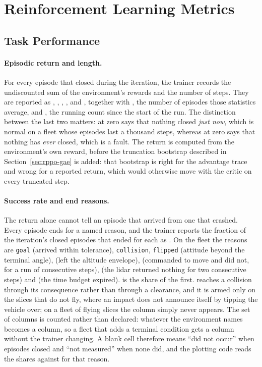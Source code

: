 \section{Reinforcement Learning Metrics}
\label{app:metrics-rl}

\subsection{Task Performance}
\label{sec:metrics-rl-task}

\paragraph{Episodic return and length.}
For every episode that closed during the iteration, the trainer records the
undiscounted sum of the environment's rewards and the number of steps. They
are reported as , ,
, ,  and
, together with , the number of episodes
those statistics average, and , the running count since
the start of the run. The distinction between the last two matters:
 at zero says that nothing closed \emph{just now}, which is
normal on a fleet whose episodes last a thousand steps, whereas
 at zero says that nothing has \emph{ever} closed, which
is a fault. The return is computed from the environment's own reward, before
the truncation bootstrap described in Section~\ref{sec:rppo-gae} is added:
that bootstrap is right for the advantage trace and wrong for a reported
return, which would otherwise move with the critic on every truncated step.

\paragraph{Success rate and end reasons.}
The return alone cannot tell an episode that arrived from one that crashed.
Every episode ends for a named reason, and the trainer reports the fraction
of the iteration's closed episodes that ended for each as .
On the fleet the reasons are \texttt{goal} (arrived within tolerance),
\texttt{collision}, \texttt{flipped} (attitude beyond the terminal angle),
 (left the altitude envelope),  (commanded to
move and did not, for a run of consecutive steps),  (the
lidar returned nothing for two consecutive steps) and 
(the time budget expired).  is the share of the first.
 reaches a collision through its consequence rather than through
a clearance, and it is armed only on the slices that do not fly, where an
impact does not announce itself by tipping the vehicle over; on a fleet of
flying slices the column simply never appears.
The set of columns is counted rather than declared: whatever the environment
names becomes a column, so a fleet that adds a terminal condition gets a
column without the trainer changing. A blank cell therefore means ``did not
occur'' when episodes closed and ``not measured'' when none did, and the
plotting code reads the shares against  for that reason.

